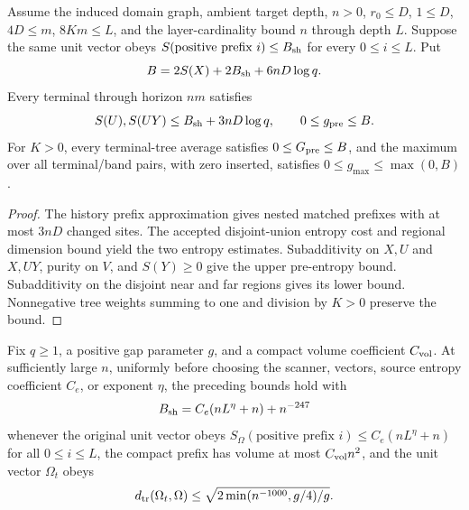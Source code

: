 \begin{lemma}
    \label{thm:actual-terminal-pre-entropy}
    \leanok
    Assume the induced domain graph, ambient target depth, $n>0$,
    $r_0\leq D$, $1\leq D$, $4D\leq m$, $8Km\leq L$, and the
    layer-cardinality bound $n$ through depth $L$.  Suppose the same unit vector
    obeys $S(\text{positive prefix }i)\leq B_{\rm sh}$ for every
    $0\leq i\leq L$.  Put
    \[
        B=2S(X)+2B_{\rm sh}+6nD\log q.
    \]
    Every terminal through horizon $nm$ satisfies
    \[
        S(U),S(UY)\leq B_{\rm sh}+3nD\log q,
        \qquad 0\leq g_{\rm pre}\leq B.
    \]
    For $K>0$, every terminal-tree average satisfies
    $0\leq G_{\rm pre}\leq B$, and the maximum over all terminal/band
    pairs, with zero inserted, satisfies $0\leq g_{\max}\leq\max(0,B)$.
\end{lemma}

\begin{proof}
    \leanok
    The history prefix approximation gives nested matched
    prefixes with at most $3nD$ changed sites.  The accepted disjoint-union
    entropy cost and regional dimension bound yield the two entropy estimates.
    Subadditivity on $X,U$ and $X,UY$, purity on $V$, and $S(Y)\geq0$ give
    the upper pre-entropy bound.  Subadditivity on the disjoint near and far
    regions gives its lower bound.  Nonnegative tree weights summing to one and
    division by $K>0$ preserve the bound.
\end{proof}

\begin{lemma}
    \label{thm:source-actual-terminal-pre-entropy}
    \leanok
    Fix $q\geq1$, a positive gap parameter $g$, and a compact volume
    coefficient $C_{\rm vol}$.  At sufficiently large $n$, uniformly before
    choosing the scanner, vectors, source entropy coefficient $C_e$, or
    exponent $\eta$, the preceding bounds hold with
    \[
        B_{\rm sh}=C_e(nL^\eta+n)+n^{-247}
    \]
    whenever the original unit vector obeys
    $S_\Omega(\text{positive prefix }i)\leq C_e(nL^\eta+n)$ for all
    $0\leq i\leq L$, the compact prefix has volume at most
    $C_{\rm vol}n^2$, and the unit vector $\Omega_t$ obeys
    \[
        d_{\rm tr}(\Omega_t,\Omega)
        \leq\sqrt{2\min(n^{-1000},g/4)/g}.
    \]
\end{lemma}

